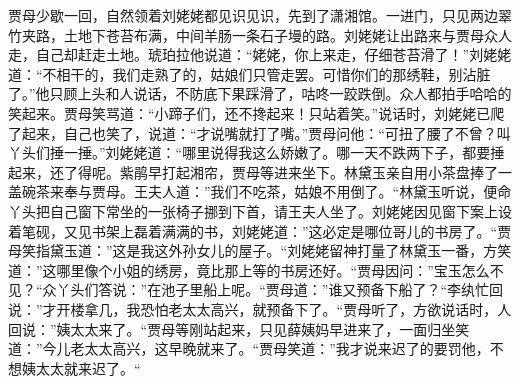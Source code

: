 \documentclass[12pt,oneside]{book}
\begin{document}
贾母少歇一回，自然领着刘姥姥都见识见识，先到了潇湘馆。一进门，只见两边翠竹夹路，土地下苍苔布满，中间羊肠一条石子墁的路。刘姥姥让出路来与贾母众人走，自己却赶走土地。琥珀拉他说道：“姥姥，你上来走，仔细苍苔滑了！”刘姥姥道：“不相干的，我们走熟了的，姑娘们只管走罢。可惜你们的那绣鞋，别沾脏了。”他只顾上头和人说话，不防底下果踩滑了，咕咚一跤跌倒。众人都拍手哈哈的笑起来。贾母笑骂道：“小蹄子们，还不搀起来！只站着笑。”说话时，刘姥姥已爬了起来，自己也笑了，说道：“才说嘴就打了嘴。”贾母问他：“可扭了腰了不曾？叫丫头们捶一捶。”刘姥姥道：“哪里说得我这么娇嫩了。哪一天不跌两下子，都要捶起来，还了得呢。紫鹃早打起湘帘，贾母等进来坐下。林黛玉亲自用小茶盘捧了一盖碗茶来奉与贾母。王夫人道：”我们不吃茶，姑娘不用倒了。“林黛玉听说，便命丫头把自己窗下常坐的一张椅子挪到下首，请王夫人坐了。刘姥姥因见窗下案上设着笔砚，又见书架上磊着满满的书，刘姥姥道：”这必定是哪位哥儿的书房了。“贾母笑指黛玉道：”这是我这外孙女儿的屋子。“刘姥姥留神打量了林黛玉一番，方笑道：”这哪里像个小姐的绣房，竟比那上等的书房还好。“贾母因问：”宝玉怎么不见？“众丫头们答说：”在池子里船上呢。“贾母道：”谁又预备下船了？“李纨忙回说：”才开楼拿几，我恐怕老太太高兴，就预备下了。“贾母听了，方欲说话时，人回说：”姨太太来了。“贾母等刚站起来，只见薛姨妈早进来了，一面归坐笑道：”今儿老太太高兴，这早晚就来了。“贾母笑道：”我才说来迟了的要罚他，不想姨太太就来迟了。“
\end{document}
